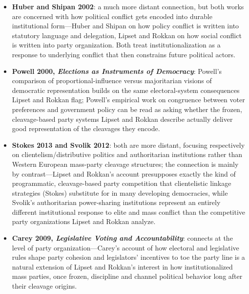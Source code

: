 \documentclass[12pt]{article}
\begin{document}
\begin{itemize}[leftmargin=*, itemsep=4pt]
    \item \textbf{Huber and Shipan 2002}: a much more distant connection, but both works are concerned with how political conflict gets encoded into durable institutional form---Huber and Shipan on how policy conflict is written into statutory language and delegation, Lipset and Rokkan on how social conflict is written into party organization. Both treat institutionalization as a response to underlying conflict that then constrains future political actors.
    \item \textbf{Powell 2000, \textit{Elections as Instruments of Democracy}}: Powell's comparison of proportional-influence versus majoritarian visions of democratic representation builds on the same electoral-system consequences Lipset and Rokkan flag; Powell's empirical work on congruence between voter preferences and government policy can be read as asking whether the frozen, cleavage-based party systems Lipset and Rokkan describe actually deliver good representation of the cleavages they encode.
    \item \textbf{Stokes 2013 and Svolik 2012}: both are more distant, focusing respectively on clientelism/distributive politics and authoritarian institutions rather than Western European mass-party cleavage structures; the connection is mainly by contrast---Lipset and Rokkan's account presupposes exactly the kind of programmatic, cleavage-based party competition that clientelistic linkage strategies (Stokes) substitute for in many developing democracies, while Svolik's authoritarian power-sharing institutions represent an entirely different institutional response to elite and mass conflict than the competitive party organizations Lipset and Rokkan analyze.
    \item \textbf{Carey 2009, \textit{Legislative Voting and Accountability}}: connects at the level of party organization---Carey's account of how electoral and legislative rules shape party cohesion and legislators' incentives to toe the party line is a natural extension of Lipset and Rokkan's interest in how institutionalized mass parties, once frozen, discipline and channel political behavior long after their cleavage origins.
\end{itemize}
\end{document}
